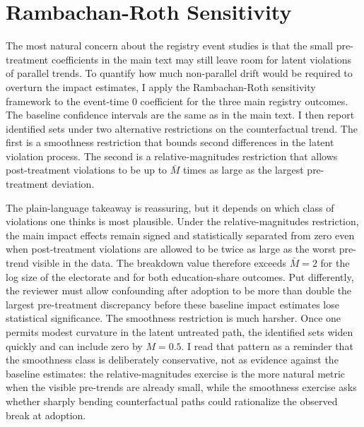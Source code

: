 \section{Rambachan-Roth Sensitivity}
\label{app:honestdid}

The most natural concern about the registry event studies is that the small pre-treatment coefficients in the main text may still leave room for latent violations of parallel trends. To quantify how much non-parallel drift would be required to overturn the impact estimates, I apply the Rambachan-Roth sensitivity framework \citep{Rambachan2023MoreCredibleApproach} to the event-time $0$ coefficient for the three main registry outcomes. The baseline confidence intervals are the same as in the main text. I then report identified sets under two alternative restrictions on the counterfactual trend. The first is a smoothness restriction that bounds second differences in the latent violation process. The second is a relative-magnitudes restriction that allows post-treatment violations to be up to $\bar{M}$ times as large as the largest pre-treatment deviation.

The plain-language takeaway is reassuring, but it depends on which class of violations one thinks is most plausible. Under the relative-magnitudes restriction, the main impact effects remain signed and statistically separated from zero even when post-treatment violations are allowed to be twice as large as the worst pre-trend visible in the data. The breakdown value therefore exceeds $\bar{M}=2$ for the log size of the electorate and for both education-share outcomes. Put differently, the reviewer must allow confounding after adoption to be more than double the largest pre-treatment discrepancy before these baseline impact estimates lose statistical significance. The smoothness restriction is much harsher. Once one permits modest curvature in the latent untreated path, the identified sets widen quickly and can include zero by $M=0.5$. I read that pattern as a reminder that the smoothness class is deliberately conservative, not as evidence against the baseline estimates: the relative-magnitudes exercise is the more natural metric when the visible pre-trends are already small, while the smoothness exercise asks whether sharply bending counterfactual paths could rationalize the observed break at adoption.

